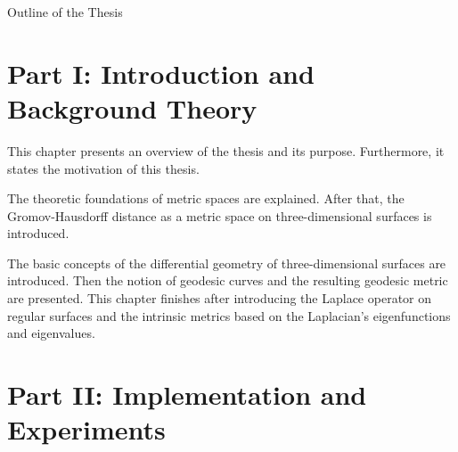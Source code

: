 \clearemptydoublepage

{}

\begin{center}
	\huge{Outline of the Thesis}
\end{center}




\section*{Part I: Introduction and Background Theory}

  \vspace{1mm}

\noindent  This chapter presents an overview of the thesis and its purpose. Furthermore, it states the motivation of this thesis.  \\

  \vspace{1mm}

\noindent  The theoretic foundations of metric spaces are explained. After that, the Gromov-Hausdorff distance as a metric space on three-dimensional surfaces is introduced.   \\

  \vspace{1mm}

\noindent  The basic concepts of the differential geometry of three-dimensional surfaces are introduced. Then the notion of geodesic curves and the resulting geodesic metric are presented.
This chapter finishes after introducing the Laplace operator on regular surfaces and the intrinsic metrics based on the Laplacian's eigenfunctions and eigenvalues.\\



\section*{Part II: Implementation and Experiments}

